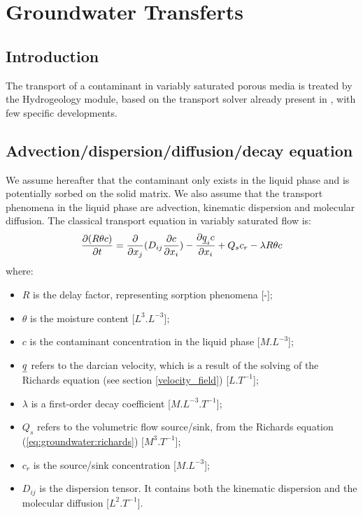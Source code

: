 \section{Groundwater Transferts}

\subsection{Introduction}
The transport of
a contaminant in variably saturated porous media is treated by the Hydrogeology module, based on the transport solver already present in \CS, with few
specific developments.

\subsection{Advection/dispersion/diffusion/decay equation}
We assume hereafter that the contaminant only exists in the liquid phase and is potentially sorbed on the solid matrix.
We also assume that the transport phenomena in the liquid phase are advection, kinematic dispersion and molecular diffusion.
The classical transport equation in variably saturated flow is:
\begin{equation}
\label{sec:groundwater:edv_disp_diff_ini}
\frac{\partial(R \theta c)}{\partial{t}}=\frac{\partial}{\partial x_j}(D_{ij} \frac{\partial c}{\partial x_i})-\frac{\partial \underline{q}_i c}{\partial x_i} + Q_s c_r - \lambda R \theta c
\end{equation}
where:
\begin {itemize}
 \item[$\bullet$] $R$ is the delay factor, representing sorption phenomena [-];
 \item[$\bullet$] $\theta$ is the moisture content [$L^3.L^{-3}$];
 \item[$\bullet$] $c$ is the contaminant concentration in the liquid phase [$M.L^{-3}$];
 \item[$\bullet$] $\underline{q}$ refers to the darcian velocity, which is a result of the solving of the Richards equation (see section \ref{velocity_field}) [$L.T^{-1}$];
 \item[$\bullet$] $\lambda$ is a first-order decay coefficient [$M.L^{-3}.T^{-1}$];
 \item[$\bullet$] $Q_s$ refers to the volumetric flow source/sink, from the Richards equation (\ref{eq:groundwater:richards}) [$M^3.T^{-1}$];
 \item[$\bullet$] $c_r$ is the source/sink concentration [$M.L^{-3}$];
 \item[$\bullet$] $D_{ij}$ is the dispersion tensor. It contains both the kinematic dispersion and the molecular diffusion [$L^2.T^{-1}$].
\end{itemize}

